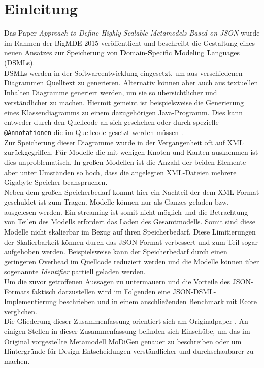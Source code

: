 \section{Einleitung}
Das Paper \textit{\glqq Approach to Define Highly Scalable Metamodels Based on JSON\grqq}\cite{gerhart2015approach} wurde im Rahmen der BigMDE 2015 veröffentlicht und beschreibt die Gestaltung eines neuen Ansatzes zur Speicherung von \textbf{D}omain-\textbf{S}pecific \textbf{M}odeling \textbf{L}anguages (DSMLs). \\
DSMLs werden in der Softwareentwicklung eingesetzt, um aus verschiedenen Diagrammen Quelltext zu generieren. Alternativ können aber auch aus textuellen Inhalten Diagramme generiert werden, um sie so übersichtlicher und verständlicher zu machen. Hiermit gemeint ist beispielsweise die Generierung eines Klassendiagramms zu einem dazugehörigen Java-Programm. Dies kann entweder durch den Quellcode an sich geschehen oder durch spezielle \texttt{@Annotationen} die im Quellcode gesetzt werden müssen \cite{france2005domain}. \\
Zur Speicherung dieser Diagramme wurde in der Vergangenheit oft auf XML zurückgegriffen. Für Modelle die mit wenigen Knoten und Kanten auskommen ist dies unproblematisch. In großen Modellen ist die Anzahl der beiden Elemente aber unter Umständen so hoch, dass die angelegten XML-Dateien mehrere Gigabyte Speicher beanspruchen.\\ 
Neben dem großen Speicherbedarf kommt hier ein Nachteil der dem XML-Format geschuldet ist zum Tragen. Modelle können nur als Ganzes geladen bzw. ausgelesen werden. Ein streaming ist somit nicht möglich und die Betrachtung von Teilen des Modells erfordert das Laden des Gesamtmodells. Somit sind diese Modelle nicht skalierbar im Bezug auf ihren Speicherbedarf. Diese Limitierungen der Skalierbarkeit können durch das JSON-Format verbessert und zum Teil sogar aufgehoben werden. Beispielsweise kann der Speicherbedarf durch einen geringeren Overhead im Quellcode reduziert werden und die Modelle können über sogenannte \textit{Identifier} partiell geladen werden. \\
Um die zuvor getroffenen Aussagen zu untermauern und die Vorteile des JSON-Formats faktisch darzustellen wird im Folgenden eine JSON-DSML-Implementierung beschrieben und in einem anschließenden Benchmark mit Ecore verglichen. \\
Die Gliederung dieser Zusammenfassung orientiert sich am Originalpaper \cite{gerhart2015approach}. An einigen Stellen in dieser Zusammenfassung befinden sich Einschübe, um das im Original vorgestellte Metamodell MoDiGen genauer zu beschreiben oder um Hintergründe für Design-Entscheidungen verständlicher und durchschaubarer zu machen. 


